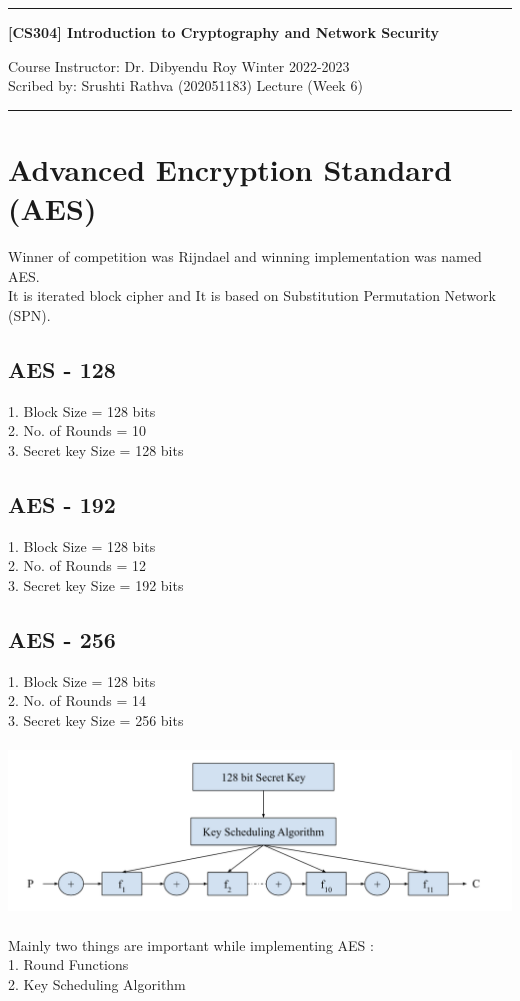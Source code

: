 \documentclass[11pt]{article}
\begin{document}
\noindent
\rule{\textwidth}{1pt}
\begin{center}
{\bf [CS304] Introduction to Cryptography and Network Security}
\end{center}
Course Instructor: Dr. Dibyendu Roy \hfill Winter 2022-2023 \\
Scribed by: Srushti Rathva (202051183) \hfill Lecture (Week 6) \\
\rule{\textwidth}{1pt}

\section*{Advanced Encryption Standard (AES)}
Winner of competition was Rijndael and winning implementation was named AES. \\
It is iterated block cipher and It is based on Substitution Permutation Network (SPN). \\

\subsection*{AES - 128}
1. Block Size = 128 bits \\
2. No. of Rounds = 10 \\
3. Secret key Size = 128 bits

\subsection*{AES - 192}
1. Block Size = 128 bits \\
2. No. of Rounds = 12 \\
3. Secret key Size = 192 bits

\subsection*{AES - 256}
1. Block Size = 128 bits \\
2. No. of Rounds = 14 \\
3. Secret key Size = 256 bits \\
\\
\includegraphics[width=500pt]{p1.png}
\\ \\
Mainly two things are important while implementing AES : \\
1. Round Functions \\
2. Key Scheduling Algorithm
\end{document}

